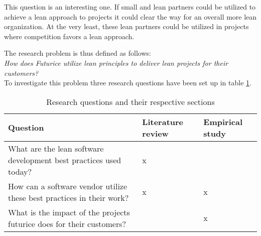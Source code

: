 This question is an interesting one. If small and lean partners could be utilized to achieve a lean approach to projects it could clear the way for an overall more lean organization. At the very least, these lean partners could be utilized in projects where competition favors a lean approach.

The research problem is thus defined as follows:\\

\textit{How does Futurice utilize lean principles to deliver lean projects for their customers?}\\

To investigate this problem three research questions have been set up in table \ref{tbl:questions}.


\begin{table}
  \begin{tabular}{p{200pt} | p{70pt} | p{70pt}}
    Question & Literature review & Empirical study \\
    \hline
    What are the lean software development best practices used today? & x & \\
    How can a software vendor utilize these best practices in their work? & x & x \\
    What is the impact of the projects futurice does for their customers? &  & x \\
  \end{tabular}
  \caption{Research questions and their respective sections}
  \label{tbl:questions}
\end{table}
